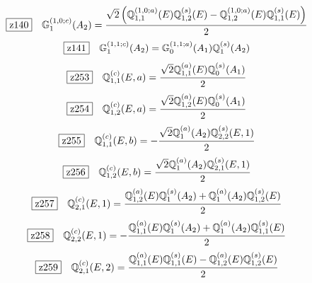\documentclass[fleqn,10pt,landscape]{jsarticle}
\begin{document}
\begin{dmath*}
\hspace*{3mm}\fbox{z140}\quad \mathbb{G}_{1}^{(1,0;c)}(A_{2})=\frac{\sqrt{2} \left(\mathbb{Q}_{1,1}^{(1,0;a)}(E) \mathbb{Q}_{1,2}^{(s)}(E) - \mathbb{Q}_{1,2}^{(1,0;a)}(E) \mathbb{Q}_{1,1}^{(s)}(E)\right)}{2}
\end{dmath*}
\begin{dmath*}
\hspace*{3mm}\fbox{z141}\quad \mathbb{G}_{1}^{(1,1;c)}(A_{2})=\mathbb{G}_{0}^{(1,1;a)}(A_{1}) \mathbb{Q}_{1}^{(s)}(A_{2})
\end{dmath*}
\begin{dmath*}
\hspace*{3mm}\fbox{z253}\quad \mathbb{Q}_{1,1}^{(c)}(E,a)=\frac{\sqrt{2} \mathbb{Q}_{1,1}^{(a)}(E) \mathbb{Q}_{0}^{(s)}(A_{1})}{2}
\end{dmath*}
\begin{dmath*}
\hspace*{3mm}\fbox{z254}\quad \mathbb{Q}_{1,2}^{(c)}(E,a)=\frac{\sqrt{2} \mathbb{Q}_{1,2}^{(a)}(E) \mathbb{Q}_{0}^{(s)}(A_{1})}{2}
\end{dmath*}
\begin{dmath*}
\hspace*{3mm}\fbox{z255}\quad \mathbb{Q}_{1,1}^{(c)}(E,b)=- \frac{\sqrt{2} \mathbb{Q}_{1}^{(a)}(A_{2}) \mathbb{Q}_{2,2}^{(s)}(E,1)}{2}
\end{dmath*}
\begin{dmath*}
\hspace*{3mm}\fbox{z256}\quad \mathbb{Q}_{1,2}^{(c)}(E,b)=\frac{\sqrt{2} \mathbb{Q}_{1}^{(a)}(A_{2}) \mathbb{Q}_{2,1}^{(s)}(E,1)}{2}
\end{dmath*}
\begin{dmath*}
\hspace*{3mm}\fbox{z257}\quad \mathbb{Q}_{2,1}^{(c)}(E,1)=\frac{\mathbb{Q}_{1,2}^{(a)}(E) \mathbb{Q}_{1}^{(s)}(A_{2}) + \mathbb{Q}_{1}^{(a)}(A_{2}) \mathbb{Q}_{1,2}^{(s)}(E)}{2}
\end{dmath*}
\begin{dmath*}
\hspace*{3mm}\fbox{z258}\quad \mathbb{Q}_{2,2}^{(c)}(E,1)=- \frac{\mathbb{Q}_{1,1}^{(a)}(E) \mathbb{Q}_{1}^{(s)}(A_{2}) + \mathbb{Q}_{1}^{(a)}(A_{2}) \mathbb{Q}_{1,1}^{(s)}(E)}{2}
\end{dmath*}
\begin{dmath*}
\hspace*{3mm}\fbox{z259}\quad \mathbb{Q}_{2,1}^{(c)}(E,2)=\frac{\mathbb{Q}_{1,1}^{(a)}(E) \mathbb{Q}_{1,1}^{(s)}(E) - \mathbb{Q}_{1,2}^{(a)}(E) \mathbb{Q}_{1,2}^{(s)}(E)}{2}
\end{dmath*}
\end{document}
